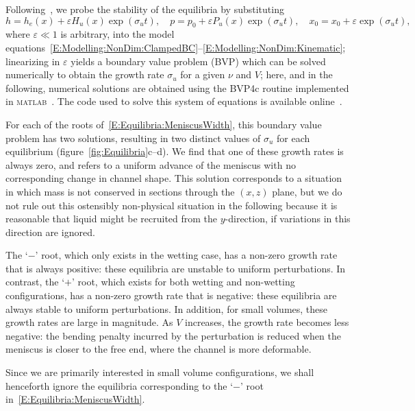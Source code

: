 \documentclass{jfm}
\renewcommand{\Pi}{P}
\renewcommand{\Lambda}{H} %
\begin{document}
Following~\citet{Taroni2012JFM}, we probe the stability of the equilibria by substituting
\begin{equation}\label{E:Equilibria:uniform_perturbation}
h = h_e(x) + \varepsilon \Lambda_u(x)\exp(\sigma_u t),\quad p = p_0 + \varepsilon \Pi_u(x)\exp(\sigma_u t),\quad x_0 = x_0 +  \varepsilon \exp(\sigma_u t),
\end{equation}
where $\varepsilon \ll 1$ is arbitrary, into the model equations~\eqref{E:Modelling:NonDim:ClampedBC}--\eqref{E:Modelling:NonDim:Kinematic}; linearizing in $\varepsilon$ yields a boundary value problem (BVP) which can be solved numerically to obtain the growth rate $\sigma_u$ for a given $\nu$ and $V$; here, and in the following, numerical solutions are obtained using the BVP4c routine implemented in \textsc{matlab}~\citep{Kierzenka2001BVP}. The code used to solve this system of equations is available online~\citet{BendocapillaryRepo}.

For each of the roots of~\eqref{E:Equilibria:MeniscusWidth}, this boundary value problem has two solutions, resulting in two distinct values of $\sigma_u$ for each equilibrium (figure~\ref{fig:Equilibria}c--d). We find that one of these growth rates is always zero, and refers to a uniform advance of the meniscus with no corresponding change in channel shape. This solution corresponds to a situation in which mass is not conserved in sections through the $(x,z)$ plane, but we do not rule out this ostensibly non-physical situation in the following because it is reasonable that liquid might be recruited from the $y$-direction, if variations in this direction are ignored.

The `$-$' root, which only exists in the wetting case, has a non-zero growth rate that is always positive: these equilibria are unstable to uniform perturbations. In contrast, the `$+$' root, which exists for both wetting and non-wetting configurations, has a non-zero growth rate that is negative: these equilibria are always stable to uniform perturbations. In addition, for small volumes, these growth rates are large in magnitude. As $V$ increases, the growth rate becomes less negative: the bending penalty incurred by the perturbation is reduced when the meniscus is closer to the free end, where the channel is more deformable.

Since we are primarily interested in small volume configurations, we shall henceforth ignore the equilibria corresponding to the `$-$' root in~\eqref{E:Equilibria:MeniscusWidth}.
\end{document}
